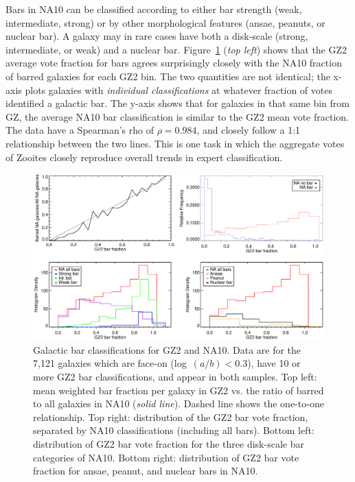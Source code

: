 \documentclass[useAMS,usenatbib]{mn2e}
\begin{document}
Bars in NA10 can be classified according to either bar strength (weak, intermediate, strong) or by other morphological features (ansae, peanuts, or nuclear bar). A galaxy may in rare cases have both a disk-scale (strong, intermediate, or weak) and a nuclear bar. Figure~\ref{fig-na_bars} ({\it top left}) shows that the GZ2 average vote fraction for bars agrees surprisingly closely with the NA10 fraction of barred galaxies for each GZ2 bin. The two quantities are not identical; the x-axis plots galaxies with {\it individual classifications} at whatever fraction of votes identified a galactic bar. The y-axis shows that for galaxies in that same bin from GZ, the average NA10 bar classification is similar to the GZ2 mean vote fraction. The data have a Spearman's rho of $\rho=0.984$, and closely follow a 1:1 relationship between the two lines. This is one task in which the aggregate votes of Zooites closely reproduce overall trends in expert classification. 

\begin{figure}
\includegraphics[angle=0,width=7.0in]{figures/na_bars_axial_10.eps}
\caption{Galactic bar classifications for GZ2 and NA10. Data are for the 7,121 galaxies which are face-on (log~$(a/b)<0.3$), have 10 or more GZ2 bar classifications, and appear in both samples. Top left: mean weighted bar fraction per galaxy in GZ2 vs. the ratio of barred to all galaxies in NA10 ({\it solid line}). Dashed line shows the one-to-one relationship. Top right: distribution of the GZ2 bar vote fraction, separated by NA10 classifications (including all bars). Bottom left: distribution of GZ2 bar vote fraction for the three disk-scale bar categories of NA10. Bottom right: distribution of GZ2 bar vote fraction for ansae, peanut, and nuclear bars in NA10. 
\label{fig-na_bars}}
\end{figure}
\end{document}
